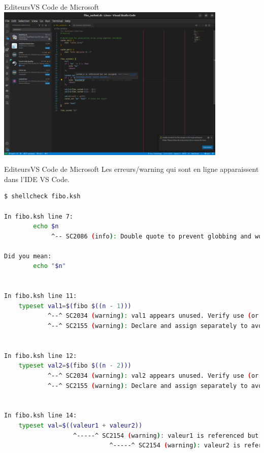 \documentclass{beamer}
\begin{document}
    \begin{frame}{Editeurs}{VS Code de Microsoft}
        \centering
        \includegraphics[width=11cm]{image/shellcheck-install}
    \end{frame}

    \begin{frame}[fragile]{Editeurs}{VS Code de Microsoft}
        Les erreurs/warning qui sont en ligne apparaissent dans l'IDE VS Code.
        \begin{lstlisting}[language=bash,basicstyle=\tiny\ttfamily]
$ shellcheck fibo.ksh

In fibo.ksh line 7:
        echo $n
             ^-- SC2086 (info): Double quote to prevent globbing and word splitting.

Did you mean:
        echo "$n"


In fibo.ksh line 11:
    typeset val1=$(fibo $((n - 1)))
            ^--^ SC2034 (warning): val1 appears unused. Verify use (or export if used externally).
            ^--^ SC2155 (warning): Declare and assign separately to avoid masking return values.


In fibo.ksh line 12:
    typeset val2=$(fibo $((n - 2)))
            ^--^ SC2034 (warning): val2 appears unused. Verify use (or export if used externally).
            ^--^ SC2155 (warning): Declare and assign separately to avoid masking return values.


In fibo.ksh line 14:
    typeset val=$((valeur1 + valeur2))
                   ^-----^ SC2154 (warning): valeur1 is referenced but not assigned.
                             ^-----^ SC2154 (warning): valeur2 is referenced but not assigned.
        \end{lstlisting}
    \end{frame}
\end{document}
